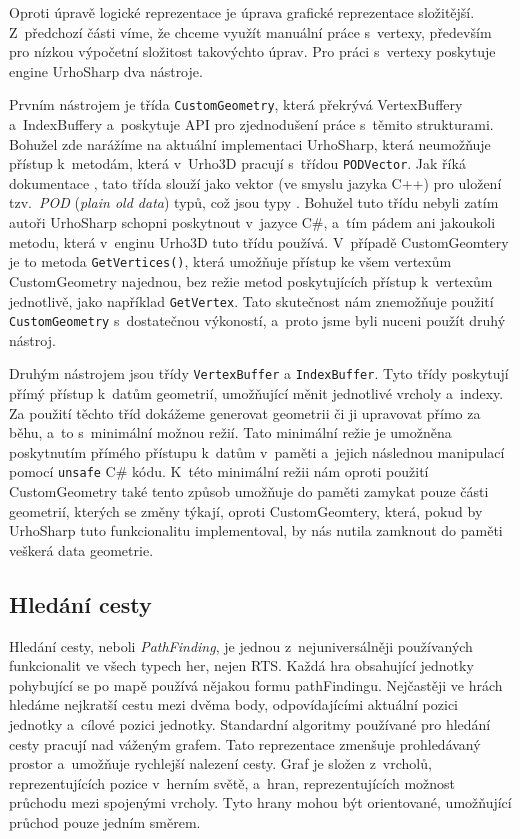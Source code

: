 Oproti úpravě logické reprezentace je úprava grafické reprezentace složitější. Z~předchozí části víme, že chceme využít manuální práce s~vertexy, především pro nízkou výpočetní složitost takovýchto úprav. Pro práci s~vertexy poskytuje engine UrhoSharp dva nástroje. 

Prvním nástrojem je třída \texttt{CustomGeometry}, která překrývá VertexBuffery a~IndexBuffery a~poskytuje API pro zjednodušení práce s~těmito strukturami. Bohužel zde narážíme na aktuální implementaci UrhoSharp, která neumožňuje přístup k~metodám, která v~Urho3D pracují s~třídou \texttt{PODVector}. Jak říká dokumentace \citep{site:urho3DPOD}, tato třída slouží jako vektor (ve smyslu jazyka C++) pro uložení tzv.~\textit{POD} (\textit{plain old data}) typů, což jsou typy \textit{} . Bohužel tuto třídu nebyli zatím autoři UrhoSharp schopni poskytnout v~jazyce C\#, a~tím pádem ani jakoukoli metodu, která v~enginu Urho3D tuto třídu používá. V~případě CustomGeomtery je to metoda \texttt{GetVertices()}, která umožňuje přístup ke všem vertexům CustomGeometry najednou, bez režie metod poskytujících přístup k~vertexům jednotlivě, jako například \texttt{GetVertex}. Tato skutečnost nám znemožňuje použití \texttt{CustomGeometry} s~dostatečnou výkoností, a~proto jsme byli nuceni použít druhý nástroj.

Druhým nástrojem jsou třídy \texttt{VertexBuffer} a \texttt{IndexBuffer}. Tyto třídy poskytují přímý přístup k~datům geometrií, umožňující měnit jednotlivé vrcholy a~indexy. Za použití těchto tříd dokážeme generovat geometrii či ji upravovat přímo za běhu, a~to s~minimální možnou režií. Tato minimální režie je umožněna poskytnutím přímého přístupu k~datům v~paměti a~jejich následnou manipulací pomocí \texttt{unsafe} C\# kódu. K~této minimální režii nám oproti použití CustomGeometry také tento způsob umožňuje do paměti zamykat pouze části geometrií, kterých se změny týkají, oproti CustomGeomtery, která, pokud by UrhoSharp tuto funkcionalitu implementoval, by nás nutila zamknout do paměti veškerá data geometrie.


\subsection{Hledání cesty}
\label{sec:pathfinding}
Hledání cesty, neboli \textit{PathFinding}, je jednou z~nejuniversálněji používaných funkcionalit ve všech typech her, nejen RTS. Každá hra obsahující jednotky pohybující se po mapě používá nějakou formu pathFindingu. Nejčastěji ve hrách hledáme nejkratší cestu mezi dvěma body, odpovídajícími aktuální pozici jednotky a~cílové pozici jednotky. Standardní algoritmy používané pro hledání cesty pracují nad váženým grafem. Tato reprezentace zmenšuje prohledávaný prostor a~umožňuje rychlejší nalezení cesty. Graf je složen z~vrcholů, reprezentujících pozice v~herním světě, a~hran, reprezentujících možnost průchodu mezi spojenými vrcholy. Tyto hrany mohou být orientované, umožňující průchod pouze jedním směrem.

